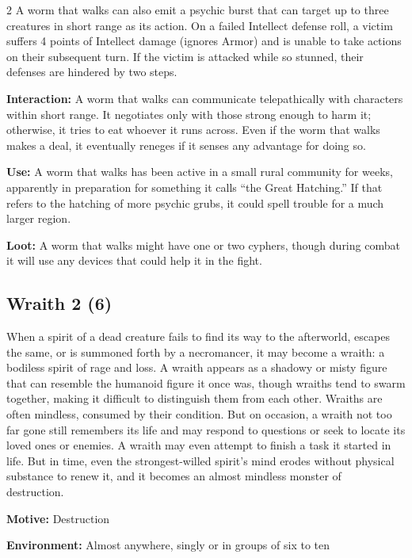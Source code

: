 \begin{multicols}{2}
A worm that walks can also emit a psychic burst that can target up to three creatures in short range as its action. On a failed Intellect defense roll, a victim suffers 4 points of Intellect damage (ignores Armor) and is unable to take actions on their subsequent turn. If the victim is attacked while so stunned, their defenses are hindered by two steps. 

\textbf{Interaction:} A worm that walks can communicate telepathically with characters within short range. It negotiates only with those strong enough to harm it; otherwise, it tries to eat whoever it runs across. Even if the worm that walks makes a deal, it eventually reneges if it senses any advantage for doing so. 

\textbf{Use:} A worm that walks has been active in a small rural community for weeks, apparently in preparation for something it calls “the Great Hatching.” If that refers to the hatching of more psychic grubs, it could spell trouble for a much larger region. 

\textbf{Loot:} A worm that walks might have one or two cyphers, though during combat it will use any devices that could help it in the fight.

\subsection{Wraith 2 (6)}

When a spirit of a dead creature fails to find its way to the afterworld, escapes the same, or is summoned forth by a necromancer, it may become a wraith: a bodiless spirit of rage and loss. A wraith appears as a shadowy or misty figure that can resemble the humanoid figure it once was, though wraiths tend to swarm together, making it difficult to distinguish them from each other. Wraiths are often mindless, consumed by their condition. But on occasion, a wraith not too far gone still remembers its life and may respond to questions or seek to locate its loved ones or enemies. A wraith may even attempt to finish a task it started in life. But in time, even the strongest-willed spirit’s mind erodes without physical substance to renew it, and it becomes an almost mindless monster of destruction. 

\textbf{Motive:} Destruction 

\textbf{Environment:} Almost anywhere, singly or in groups of six to ten 


\end{multicols}
